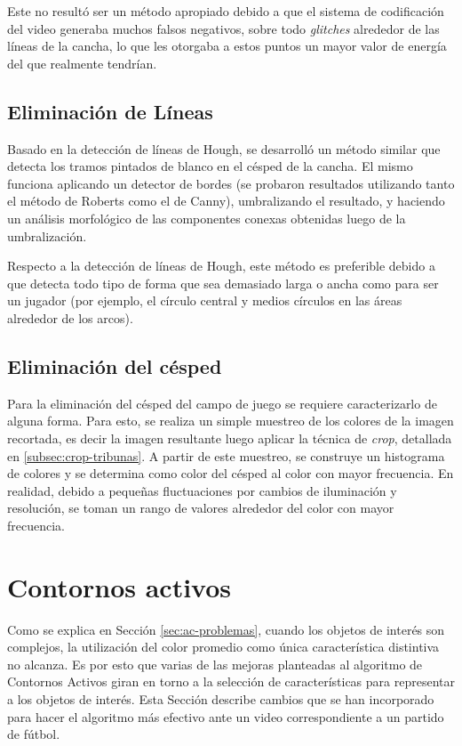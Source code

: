 Este no resultó ser un método apropiado debido a que el sistema de codificación
del video generaba muchos falsos negativos, sobre todo \textit{glitches}
alrededor de las líneas de la cancha, lo que les otorgaba a estos puntos un
mayor valor de energía del que realmente tendrían.

\subsection{Eliminación de Líneas}

Basado en la detección de líneas de Hough, se desarrolló un método similar que
detecta los tramos pintados de blanco en el césped de la cancha. El mismo
funciona aplicando un detector de bordes (se probaron resultados utilizando
tanto el método de Roberts como el de Canny), umbralizando el resultado, y
haciendo un análisis morfológico de las componentes conexas obtenidas luego de
la umbralización.

Respecto a la detección de líneas de Hough, este método es preferible debido
a que detecta todo tipo de forma que sea demasiado larga o ancha como para
ser un jugador (por ejemplo, el círculo central y medios círculos en las
áreas alrededor de los arcos).

\subsection{Eliminación del césped}

Para la eliminación del césped del campo de juego se requiere caracterizarlo
de alguna forma. Para esto, se realiza un simple muestreo de los colores de
la imagen recortada, es decir la imagen resultante luego aplicar la técnica
de \textit{crop}, detallada en \ref{subsec:crop-tribunas}. A partir de este
muestreo, se construye un histograma de colores y se determina como color del
césped al color con mayor frecuencia. En realidad, debido a pequeñas
fluctuaciones por cambios de iluminación y resolución, se toman un rango de
valores alrededor del color con mayor frecuencia.

\section{Contornos activos}
\label{sec:ac-extension}

Como se explica en Sección \ref{sec:ac-problemas}, cuando los objetos de
interés son complejos, la utilización del color promedio como única
característica distintiva no alcanza. Es por esto que varias de las mejoras
planteadas al algoritmo de Contornos Activos giran en torno a la selección de
características para representar a los objetos de interés. Esta Sección
describe cambios que se han incorporado para hacer el algoritmo más efectivo
ante un video correspondiente a un partido de fútbol.

